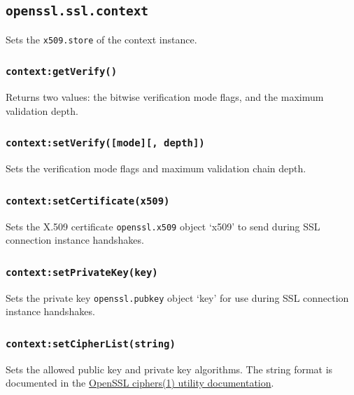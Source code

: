 \documentclass[11pt, oneside]{memoir}
\newcommand*{\fn}[1]{\texttt{#1}\xspace}
\newcommand*{\module}[1]{\texttt{#1}\xspace}
\newcounter{toccols}
\newenvironment{Module}[1]{
	\subsection{\texttt{#1}}
	\addtocontents{toc}{
		\protect\begin{multicols}{\value{toccols}}
	}
}{
	\addtocontents{toc}{\protect\end{multicols}}
}
\begin{document}
\begin{Module}{openssl.ssl.context}
Sets the \module{x509.store} of the context instance.

\subsubsection[\fn{context:getVerify}]{\fn{context:getVerify()}}

Returns two values: the bitwise verification mode flags, and the maximum validation depth.

\subsubsection[\fn{context:setVerify}]{\fn{context:setVerify([mode][, depth])}}

Sets the verification mode flags and maximum validation chain depth.

\subsubsection[\fn{context:setCertificate}]{\fn{context:setCertificate(x509)}}

Sets the X.509 certificate \module{openssl.x509} object `x509' to send during SSL connection instance handshakes.

\subsubsection[\fn{context:setPrivateKey}]{\fn{context:setPrivateKey(key)}}

Sets the private key \module{openssl.pubkey} object `key' for use during SSL connection instance handshakes.

\subsubsection[\fn{context:setCipherList}]{\fn{context:setCipherList(string)}}

Sets the allowed public key and private key algorithms. The string format is documented in the \href{http://www.openssl.org/docs/apps/ciphers.html#CIPHER_LIST_FORMAT}{OpenSSL ciphers(1) utility documentation}.

\end{Module}
\end{document}

